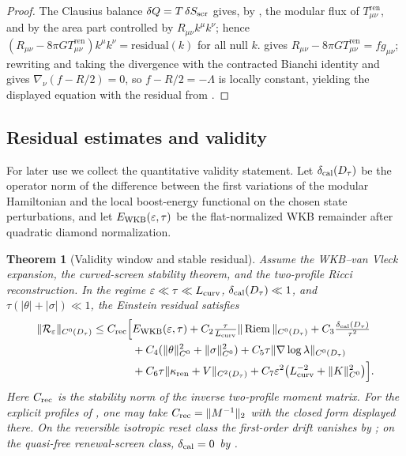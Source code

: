 \documentclass[11pt]{article}
\newtheorem{theorem}{Theorem}[section]
\theoremstyle{definition}
\theoremstyle{remark}
\newcommand{\eps}{\varepsilon}
\newcommand{\Tren}{T^{\mathrm{ren}}}
\newcommand{\ren}{\mathrm{ren}}
\newcommand{\Riem}{\operatorname{Riem}}
\begin{document}
\begin{proof}
The Clausius balance $\delta Q=T\,\delta S_{\rm scr}$ gives, by
, the modular flux of $\Tren_{\mu\nu}$, and by
 the area part controlled by $R_{\mu\nu}k^\mu k^\nu$; hence
$(R_{\mu\nu}-8\pi G\Tren_{\mu\nu})k^\mu k^\nu=\text{residual}(k)$ for all null $k$.
 gives $R_{\mu\nu}-8\pi G\Tren_{\mu\nu}=fg_{\mu\nu}$;
rewriting and taking the divergence with the contracted Bianchi identity and
 gives $\nabla_\nu(f-R/2)=0$, so $f-R/2=-\Lambda$ is
locally constant, yielding the displayed equation with the residual from
.
\end{proof}

\subsection{Residual estimates and validity}

For later use we collect the quantitative validity statement.  Let
$\delta_{\rm cal}(D_\tau)$ be the operator norm of the difference between the
first variations of the modular Hamiltonian and the local boost-energy
functional on the chosen state perturbations, and let
$E_{\rm WKB}(\eps,\tau)$ be the flat-normalized WKB remainder after quadratic
diamond normalization.

\begin{theorem}[Validity window and stable residual]
\label{thm:validity-window}
Assume the WKB--van Vleck expansion, the curved-screen stability theorem, and
the two-profile Ricci reconstruction.  In the regime
$\eps\ll\tau\ll L_{\rm curv}$, $\delta_{\rm cal}(D_\tau)\ll1$, and
$\tau(|\theta|+|\sigma|)\ll1$, the Einstein residual satisfies
\[
\begin{split}
 \|\mathcal R_\eps\|_{C^0(D_\tau)}\le C_{\rm rec}\Big[
 &E_{\rm WKB}(\eps,\tau)
 +C_2\tfrac{\tau}{L_{\rm curv}}\|\Riem\|_{C^0(D_\tau)}
 +C_3\tfrac{\delta_{\rm cal}(D_\tau)}{\tau^2}\\
 &+C_4(\|\theta\|_{C^0}^2+\|\sigma\|_{C^0}^2)
 +C_5\tau\|\nabla\log\lambda\|_{C^0(D_\tau)}\\
 &+C_6\tau\|\kappa_{\ren}+V\|_{C^2(D_\tau)}
 +C_7\eps^2\big(L_{\rm curv}^{-2}+\|K\|_{C^0}^2\big)\Big].
\end{split}
\]
Here $C_{\rm rec}$ is the stability norm of the inverse two-profile moment
matrix.  For the explicit profiles of , one may
take $C_{\rm rec}=\|M^{-1}\|_2$ with the closed form displayed there.  On the
reversible isotropic reset class the first-order drift vanishes by
; on the quasi-free renewal-screen class,
$\delta_{\rm cal}=0$ by .
\end{theorem}
\end{document}

